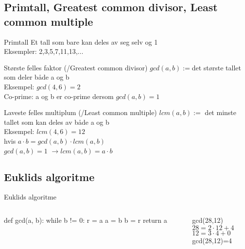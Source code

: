 \subsection*{Primtall, Greatest common divisor, Least common multiple}
\begin{frame}
\begin{block}{Primtall}
Et tall som bare kan deles av seg selv og 1\\
Eksempler: 2,3,5,7,11,13,...
\end{block}
\pause
\begin{block}{Største felles faktor (/Greatest common divisor)}
$gcd(a,b) := $det største tallet som deler både a og b\\
Eksempel: $gcd(4,6)=2$\\
Co-prime: a og b er co-prime dersom $gcd(a,b)=1$
\end{block}
\pause
\begin{block}{Laveste felles multiplum (/Least common multiple)}
$lcm(a,b) := $ det minste tallet som kan deles av både a og b\\
Eksempel: $lcm(4,6)=12$\\
hvis $a\cdot b=gcd(a,b)\cdot lcm(a,b)$\\
$gcd(a,b) = 1$ $\rightarrow lcm(a,b) = a\cdot b$
\end{block}
\end{frame}

\subsection*{Euklids algoritme}
\begin{frame}[fragile]{Euklids algoritme}
\begin{columns}
    \begin{column}{0.45\textwidth}
\begin{python}
def gcd(a, b):
    while b != 0:
        r = a %
        a = b
        b = r
    return a
\end{python}
 	\end{column}
 	\pause
    \begin{column}{0.45\textwidth} %
    \begin{center}
       gcd(28,12)\\
       
    $28=2\cdot 12+4$\\
    $12=3\cdot 4+0$\\
    
    gcd(28,12)=4 
    \end{center}
 	\end{column}
\end{columns}


\end{frame}

